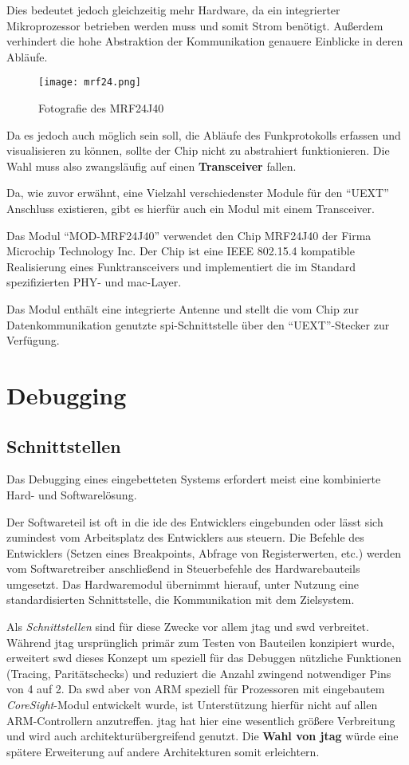 Dies bedeutet jedoch gleichzeitig mehr Hardware, da ein integrierter
Mikroprozessor betrieben werden muss und somit Strom benötigt.
Außerdem verhindert die hohe Abstraktion der Kommunikation genauere Einblicke in
deren Abläufe.

\begin{figure}[!ht]
\centering
\texttt{[image: mrf24.png]}\\
\caption{Fotografie des MRF24J40}{}
\end{figure}

Da es jedoch auch möglich sein soll, die Abläufe des Funkprotokolls erfassen und
visualisieren zu können, sollte der Chip nicht zu abstrahiert funktionieren. Die
Wahl muss also zwangsläufig auf einen \textbf{Transceiver} fallen.

Da, wie zuvor erwähnt, eine Vielzahl verschiedenster Module für den "`UEXT"'
Anschluss existieren, gibt es hierfür auch ein Modul mit einem Transceiver.

Das Modul "`MOD-MRF24J40"' verwendet den Chip MRF24J40\cite{MRF} der Firma
Microchip Technology Inc. Der Chip ist eine IEEE 802.15.4\cite{IEEE01}
kompatible Realisierung eines Funktransceivers und implementiert die im Standard
spezifizierten PHY- und \gls{mac}-Layer.

Das Modul enthält eine integrierte Antenne und stellt die vom Chip zur
Datenkommunikation genutzte \gls{spi}-Schnittstelle über den "`UEXT"'-Stecker
zur Verfügung.
\section{Debugging}
\subsection{Schnittstellen}
Das Debugging eines eingebetteten Systems erfordert meist eine kombinierte Hard-
und Softwarelösung.

Der Softwareteil ist oft in die \gls{ide} des Entwicklers eingebunden oder lässt
sich zumindest vom Arbeitsplatz des Entwicklers aus steuern. Die Befehle des
Entwicklers (Setzen eines Breakpoints, Abfrage von Registerwerten, etc.) werden
vom Softwaretreiber anschließend in Steuerbefehle des Hardwarebauteils
umgesetzt. Das Hardwaremodul übernimmt hierauf, unter Nutzung eine
standardisierten Schnittstelle, die Kommunikation mit dem Zielsystem.

Als \emph{Schnittstellen} sind für diese Zwecke vor allem \gls{jtag} und
\gls{swd} verbreitet. Während \gls{jtag} ursprünglich primär zum Testen von Bauteilen
konzipiert wurde, erweitert \gls{swd} dieses Konzept um speziell für das
Debuggen nützliche Funktionen (Tracing, Paritätschecks) und reduziert die Anzahl
zwingend notwendiger Pins von 4 auf 2. Da \gls{swd} aber von
ARM speziell für Prozessoren mit eingebautem \emph{CoreSight}-Modul entwickelt
wurde, ist Unterstützung hierfür nicht auf allen ARM-Controllern anzutreffen. \gls{jtag}
hat hier eine wesentlich größere Verbreitung und wird auch
architekturübergreifend genutzt. Die \textbf{Wahl von \gls{jtag}} würde eine
spätere Erweiterung auf andere Architekturen somit erleichtern.
